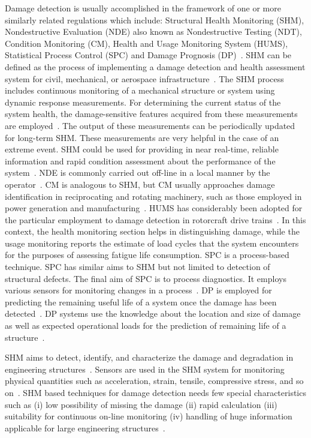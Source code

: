 \documentclass[b5paper, 11pt, titlepage]{book}
\begin{document}
Damage detection is usually accomplished in the framework of one or more similarly related regulations which include: Structural Health Monitoring (SHM), Nondestructive Evaluation (NDE) also known as Nondestructive Testing (NDT), Condition Monitoring (CM), Health and Usage Monitoring System (HUMS), Statistical Process Control (SPC) and Damage Prognosis (DP)~\cite{Farrar2007, Farrar2012}. SHM can be defined as the process of implementing a damage detection and health assessment system for civil, mechanical, or aerospace  infrastructure~\cite{Farrar2007, Farrar2012}. The SHM process includes continuous monitoring of a mechanical structure or system using dynamic response measurements. For determining the current status of the system health, the damage-sensitive features acquired from these measurements are employed~\cite{Farrar2007, Farrar2012}. The output of these measurements can be periodically updated for long-term SHM. These measurements are very helpful in the case of an extreme event. SHM could be used for providing in near real-time, reliable information and rapid condition assessment about the performance of the system~\cite{Farrar2012}. NDE is commonly carried out off-line in a local manner by the operator~\cite{stepinski2013advanced, shull2002nondestructive}. CM is analogous to SHM, but CM usually approaches damage identification in reciprocating and rotating machinery, such as those employed in power generation and manufacturing~\cite{Worden2004}. HUMS has considerably been adopted for the particular employment to damage detection in rotorcraft drive trains~\cite{Samuel2005}. In this context, the health monitoring section helps in distinguishing damage, while the usage monitoring reports the estimate of load cycles that the system encounters for the purposes of assessing fatigue life consumption. SPC is a process-based technique. SPC has similar aims to SHM but not limited to detection of structural defects. The final aim of SPC is to process diagnostics. It employs various sensors for monitoring changes in a process~\cite{stepinski2013advanced, montgomery2009dmaic}. DP is employed for predicting the remaining useful life of a system once the damage has been detected~\cite{farrar2003damage, Farrar2007, Farrar2012}. DP systems use the knowledge about the location and size of damage as well as expected operational loads for the prediction of remaining life of a structure~\cite{stepinski2013advanced}. 

SHM aims to detect, identify, and characterize the damage and degradation in engineering structures~\cite{gopalakrishnan2011computational}. Sensors are used in the SHM system for monitoring physical quantities such as acceleration, strain, tensile, compressive stress, and so on~\cite{Lamonaca2018}. SHM based techniques for damage detection needs few special characteristics such as (i) low possibility of missing the damage (ii) rapid calculation (iii) suitability for continuous on-line monitoring (iv) handling of huge information applicable for large engineering structures~\cite{lee2008overview}.
\end{document}
